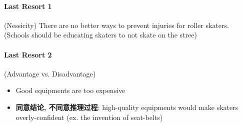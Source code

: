 \documentclass{article}
\begin{document}
    \paragraph{Last Resort 1} (Nessicity) There are no better ways to prevent
    injuries for roller skaters. (Schools should be educating skaters to not
    skate on the stree)

    \paragraph{Last Resort 2} (Advantage vs. Disadvantage)
    \begin{itemize}
      \item Good equipments are too expensive
      \item \textbf{同意结论, 不同意推理过程}: high-quality equipments would make
      skaters overly-confident (ex. the invention of seat-belts)
    \end{itemize}
\end{document}
